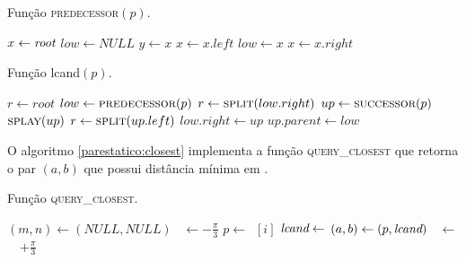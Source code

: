 \begin{algorithm}
    \caption{Função \textsc{predecessor}$(p)$.}
    \label{parestatico:predecessor}
\begin{algorithmic}[1]
        \State $x \leftarrow \textit{root}$
        \State $low \leftarrow NULL$
            \State $y \leftarrow x$
                \State $x \leftarrow x.left$
            \Else
                \State $low \leftarrow x$
                \State $x \leftarrow x.right$
            \EndIf
        \EndWhile
         
            \State {}
        \EndIf
        \State {}
    \EndFunction
\end{algorithmic}
\end{algorithm}

\begin{algorithm}
    \caption{Função lcand$(p)$.} \label{parestatico:lcand}
\begin{algorithmic}[1]
        \State $r \leftarrow root$
        \State $low \leftarrow \Call{predecessor}{p}$
            \State {}
            \State $r \leftarrow \Call{split}{low.right}$
        \EndIf
        \State $up \leftarrow \Call{successor}{p}$
            \State $\Call{splay}{up}$
            \State $r \leftarrow \Call{split}{up.left}$
        \EndIf
            \State $low.right \leftarrow up$
            \State $up.parent \leftarrow low$
        \EndIf
        \State {}
    \EndFunction
\end{algorithmic}
\end{algorithm}

O algoritmo \ref{parestatico:closest} implementa a função
\textsc{query\_closest} que retorna o par $(a,b)$ que possui distância
mínima em \pontos.

\begin{algorithm}
    \caption{Função \textsc{query\_closest}.} \label{parestatico:closest}
\begin{algorithmic}[1]
        \State $(m,n) \leftarrow (NULL, NULL)$
        \State \angulo~$\leftarrow -\frac{\pi}{3}$
            \State {} 
                \State $p \leftarrow $~\pontos$[i]$
                \State $\textit{lcand} \leftarrow $ 
                \State {}
                    \State $(a, b) \leftarrow (p, \textit{lcand})$
                \EndIf
            \EndFor
            \State \angulo~$\leftarrow$~\angulo~$ + \frac{\pi}{3}$
            \State {} 
        \EndWhile
        \State {}
    \EndFunction
\end{algorithmic}
\end{algorithm}